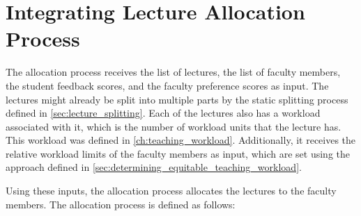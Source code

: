 \section{Integrating Lecture Allocation Process}
\label{sec:allocation_process}

The allocation process receives the list of lectures, the list of faculty members, the student feedback scores, and the faculty preference scores as input. The lectures might already be split into multiple parts by the static splitting process defined in \autoref{sec:lecture_splitting}. Each of the lectures also has a workload associated with it, which is the number of workload units that the lecture has. This workload was defined in \autoref{ch:teaching_workload}. Additionally, it receives the relative workload limits of the faculty members as input, which are set using the approach defined in \autoref{sec:determining_equitable_teaching_workload}.

Using these inputs, the allocation process allocates the lectures to the faculty members. The allocation process is defined as follows:

